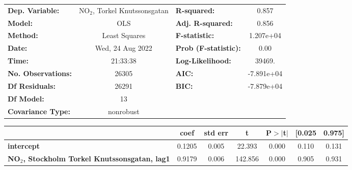 \begin{landscape}
\begin{table}
\begin{center}
\begin{tabular}{lclc}
\toprule
\textbf{Dep. Variable:}                                     & NO$_2$, Torkel Knutssonsgatan & \textbf{  R-squared:         } &     0.857   \\
\textbf{Model:}                                             &               OLS                & \textbf{  Adj. R-squared:    } &     0.856   \\
\textbf{Method:}                                            &          Least Squares           & \textbf{  F-statistic:       } & 1.207e+04   \\
\textbf{Date:}                                              &         Wed, 24 Aug 2022         & \textbf{  Prob (F-statistic):} &     0.00    \\
\textbf{Time:}                                              &             21:33:38             & \textbf{  Log-Likelihood:    } &    39469.   \\
\textbf{No. Observations:}                                  &               26305              & \textbf{  AIC:               } & -7.891e+04  \\
\textbf{Df Residuals:}                                      &               26291              & \textbf{  BIC:               } & -7.879e+04  \\
\textbf{Df Model:}                                          &                  13              & \textbf{                     } &             \\
\textbf{Covariance Type:}                                   &            nonrobust             & \textbf{                     } &             \\
\bottomrule
\end{tabular}
\begin{tabular}{lcccccc}
                                                            & \textbf{coef} & \textbf{std err} & \textbf{t} & \textbf{P$> |$t$|$} & \textbf{[0.025} & \textbf{0.975]}  \\
\midrule
\textbf{intercept}                                          &       0.1205  &        0.005     &    22.393  &         0.000        &        0.110    &        0.131     \\
\textbf{NO$_2$, Stockholm Torkel Knutssonsgatan, lag1}   &       0.9179  &        0.006     &   142.856  &         0.000        &        0.905    &        0.931     \\

\end{tabular}
\end{center}
\end{table}
\end{landscape}

